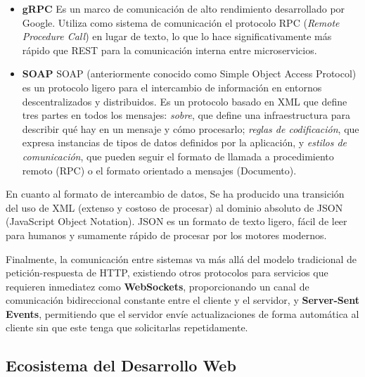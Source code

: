 \begin{itemize}
    Es especialmente útil para crear APIs en entornos complejos con requisitos de interfaz que cambian rápidamente. Ni 
    las API de REST ni las de GraphQL son inherentemente superiores; son herramientas diferentes que se adaptan a 
    diferentes tareas.

    \item \textbf{gRPC} \cite{grpc}
    \newline
    Es un marco de comunicación de alto rendimiento desarrollado por Google. Utiliza como sistema de comunicación
    el protocolo RPC (\textit{Remote Procedure Call}) en lugar de texto, lo que lo hace significativamente más rápido 
    que REST para la comunicación interna entre microservicios.

    \item \textbf{SOAP} \cite{soap}
    \newline
    SOAP (anteriormente conocido como Simple Object Access Protocol) es un protocolo ligero para el intercambio de 
    información en entornos descentralizados y distribuidos. Es un protocolo basado en XML que define tres partes 
    en todos los mensajes: \textit{sobre}, que define una infraestructura para describir qué hay en un mensaje y 
    cómo procesarlo; \textit{reglas de codificación}, que expresa instancias de tipos de datos definidos por la 
    aplicación, y \textit{estilos de comunicación}, que pueden seguir el formato de llamada a procedimiento remoto 
    (RPC) o el formato orientado a mensajes (Documento). 
\end{itemize}

En cuanto al formato de intercambio de datos, Se ha producido una transición del uso de XML (extenso y costoso de 
procesar) al dominio absoluto de JSON (JavaScript Object Notation). JSON es un formato de texto ligero, fácil de 
leer para humanos y sumamente rápido de procesar por los motores modernos.

Finalmente, la comunicación entre sistemas va más allá del modelo tradicional de petición-respuesta de HTTP, existiendo 
otros protocolos para servicios que requieren inmediatez como \textbf{WebSockets}, proporcionando un canal de comunicación 
bidireccional constante entre el cliente y el servidor, y \textbf{Server-Sent Events}, permitiendo que el servidor envíe 
actualizaciones de forma automática al cliente sin que este tenga que solicitarlas repetidamente.

\subsection{Ecosistema del Desarrollo Web}

